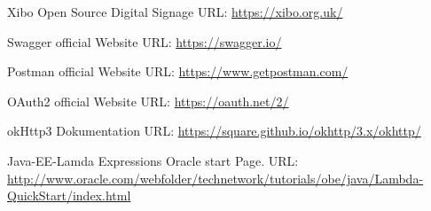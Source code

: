 \begin{thebibliography}{9}

Xibo Open Source Digital Signage
\newblock URL: {\small \url{https://xibo.org.uk/}}

Swagger official Website
\newblock URL: {\small \url{https://swagger.io/}}

Postman official Website
\newblock URL: {\small \url{https://www.getpostman.com/}}

OAuth2 official Website
\newblock URL: {\small \url{https://oauth.net/2/}}

okHttp3 Dokumentation
\newblock URL: {\small \url{https://square.github.io/okhttp/3.x/okhttp/}}



Java-EE-Lamda Expressions Oracle start Page.
\newblock URL: {\small \url{http://www.oracle.com/webfolder/technetwork/tutorials/obe/java/Lambda-QuickStart/index.html}}


\end{thebibliography}